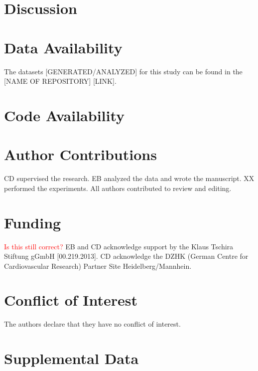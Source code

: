 \documentclass[utf8]{FrontiersinHarvard} %
\newcommand*{\red}{\textcolor{red}}
\begin{document}
\section*{Discussion}



\section*{Data Availability}
The datasets [GENERATED/ANALYZED] for this study can be found in the [NAME OF REPOSITORY] [LINK].

\section*{Code Availability}


\section*{Author Contributions}
CD supervised the research.
EB analyzed the data and wrote the manuscript. 
XX performed the experiments.
All authors contributed to review and editing.


\section*{Funding}
\red{Is this still correct?}
EB and CD acknowledge support by the Klaus Tschira Stiftung gGmbH [00.219.2013]. 
CD acknowledge the DZHK (German Centre for Cardiovascular Research) Partner Site Heidelberg/Mannhein.


\section*{Conflict of Interest}
The authors declare that they have no conflict of interest.


\section*{Supplemental Data}
\end{document}
